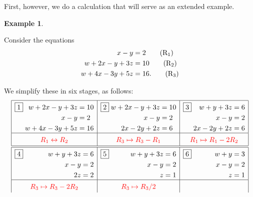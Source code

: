 \documentclass[a4paper]{book}
\newcommand{\RED}[1]{{\color{red}#1}}
\renewcommand{\:}{\colon}
\newcommand{\bilabel}[1]{\hypertarget{#1}{\label{#1}}}
\theoremstyle{definition}
\newtheorem{example}[theorem]{Example}
\begin{document}
First, however, we do a calculation that will serve as an extended
example.
\begin{example}\bilabel{eg-lineq}
 Consider the equations
 \begin{align*}
  x-y       &= 2   \tag{R${}_1$}\\
  w+2x-y+3z &= 10  \tag{R${}_2$}\\
  w+4x-3y+5z&= 16. \tag{R${}_3$}
 \end{align*}

 We simplify these in six stages, as follows:
 {\small \[
 \renewcommand{\arraystretch}{1.5}
  \begin{array}{|c|c|c|}
 \hline 
 \framebox{1}\;\hfill
 \begin{aligned}[t]
  w+2x-y+3z &= 10  \\
  x-y       &= 2   \\
  w+4x-3y+5z&= 16
 \end{aligned} &
 \framebox{2}\;\hfill
 \begin{aligned}[t]
  w+2x-y+3z &= 10  \\
  x-y       &= 2   \\
  2x-2y+2z   &= 6
 \end{aligned} &
 \framebox{3}\;\hfill
 \begin{aligned}[t]
  w+y+3z &= 6  \\
  x-y    &= 2   \\
  2x-2y+2z   &= 6
 \end{aligned} \\
 \hline
 \RED{R_1\leftrightarrow R_2} & 
 \RED{R_3\mapsto R_3-R_1} &
 \RED{R_1 \mapsto R_1-2R_2} \\
 \hline\hline 
 \framebox{4}\;\hfill
 \begin{aligned}[t]
  w+y+3z &= 6  \\
  x-y    &= 2   \\
  2z   &= 2
 \end{aligned} &
 \framebox{5}\;\hfill
 \begin{aligned}[t]
  w+y+3z &= 6  \\
  x-y &= 2   \\
  z   &= 1
 \end{aligned} &
 \framebox{6}\;\hfill
 \begin{aligned}[t]
  w+y &= 3  \\
  x-y &= 2   \\
  z   &= 1
 \end{aligned} \\
 \hline
 \RED{R_3 \mapsto R_3-2R_2} &
 \RED{R_3 \mapsto R_3/2} &

\end{array}\]}
\end{example}
\end{document}
